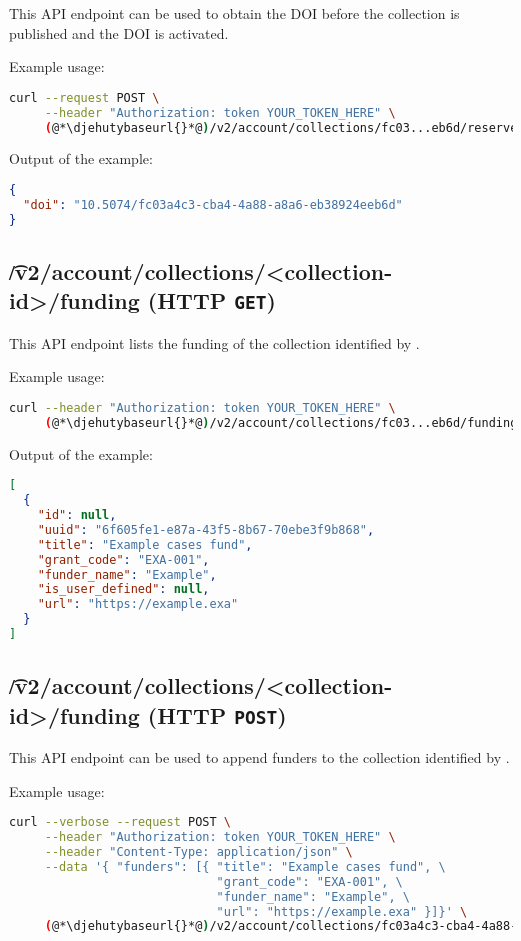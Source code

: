   This API endpoint can be used to obtain the DOI before the collection is
  published and the DOI is activated.

  Example usage:
\begin{lstlisting}[language=bash]
curl --request POST \
     --header "Authorization: token YOUR_TOKEN_HERE" \
     (@*\djehutybaseurl{}*@)/v2/account/collections/fc03...eb6d/reserve_doi | jq
\end{lstlisting}

  Output of the example:
\begin{lstlisting}[language=JSON]
{
  "doi": "10.5074/fc03a4c3-cba4-4a88-a8a6-eb38924eeb6d"
}
\end{lstlisting}

\subsection{\t{/v2/account/collections/<collection-id>/funding} (HTTP \texttt{GET})}

  This API endpoint lists the funding of the collection identified by .

  Example usage:
\begin{lstlisting}[language=bash]
curl --header "Authorization: token YOUR_TOKEN_HERE" \
     (@*\djehutybaseurl{}*@)/v2/account/collections/fc03...eb6d/funding | jq
\end{lstlisting}

  Output of the example:
\begin{lstlisting}[language=JSON]
[
  {
    "id": null,
    "uuid": "6f605fe1-e87a-43f5-8b67-70ebe3f9b868",
    "title": "Example cases fund",
    "grant_code": "EXA-001",
    "funder_name": "Example",
    "is_user_defined": null,
    "url": "https://example.exa"
  }
]
\end{lstlisting}

\subsection{\t{/v2/account/collections/<collection-id>/funding} (HTTP \texttt{POST})}
\label{sec:api-v2-collections-funding-post}

  This API endpoint can be used to append funders to the collection identified
  by \code{collection-id}.

  Example usage:
\begin{lstlisting}[language=bash]
curl --verbose --request POST \
     --header "Authorization: token YOUR_TOKEN_HERE" \
     --header "Content-Type: application/json" \
     --data '{ "funders": [{ "title": "Example cases fund", \
                             "grant_code": "EXA-001", \
                             "funder_name": "Example", \
                             "url": "https://example.exa" }]}' \
     (@*\djehutybaseurl{}*@)/v2/account/collections/fc03a4c3-cba4-4a88-a8a6-eb38924eeb6d/funding
\end{lstlisting}


